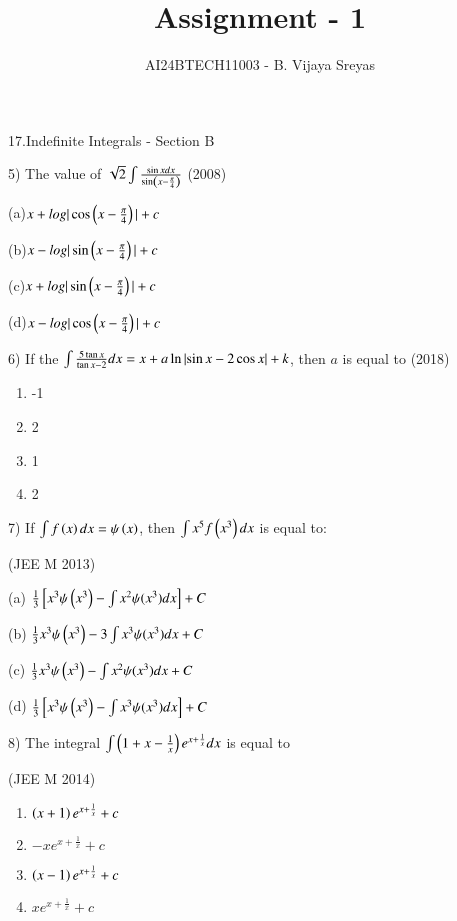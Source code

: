 \documentclass[journal,12pt,twocolumn]{IEEEtran}
\theoremstyle{remark}
\begin{document}

\vspace{3cm}

\title{Assignment - 1}
\author{AI24BTECH11003 - B. Vijaya Sreyas}
\maketitle
\newpage
\bigskip

\renewcommand{\thefigure}{\theenumi}
\renewcommand{\thetable}{\theenumi}

17.Indefinite Integrals - Section B

5)
	 The value of $\sqrt{2}\int\frac{\sin xdx}{\sin \left(x-\frac{\pi}{4}\right)}$
		\hfill{(2008)}

		(a)$x+log|\cos \left(x-\frac{\pi}{4}\right)|+c$

		(b)$x-log|\sin \left(x-\frac{\pi}{4}\right)|+c$

		(c)$x+log|\sin \left(x-\frac{\pi}{4}\right)|+c$

		(d)$x-log|\cos \left(x-\frac{\pi}{4}\right)|+c$

6)
	 If the $\int\frac{5\tan x}{\tan x-2}dx=x+a\ln \left\vert\sin x-2\cos x\right\vert+k$, then $a$ is equal to
		\hfill{(2018)}

		\begin{multicols}{4}
			\begin{enumerate}[label=(\alph*)]
				\item -1
				\item 2
				\item 1
				\item 2
			\end{enumerate}
		\end{multicols}
		
7)
	If $\int f\left(x\right)dx=\psi\left(x\right)$, then $\int x^5f\left(x^3\right)dx$ is equal to:

		\hfill{(JEE M 2013)}

		(a) $\frac{1}{3}{}\left[x^3\psi\left(x^3\right)-\int x^2\psi(x^3)dx\right] + C$

		(b) $\frac{1}{3}x^3\psi\left(x^3\right)-3\int x^3\psi(x^3)dx + C$

		(c) $\frac{1}{3}x^3\psi\left(x^3\right)-\int x^2\psi(x^3)dx + C$

		(d) $\frac{1}{3}{}\left[x^3\psi\left(x^3\right)-\int x^3\psi(x^3)dx\right] + C$

8)
	 The integral $\int\left(1+x-\frac{1}{x}\right)e^{x+\frac{1}{x}}dx$ is equal to

		\hfill{(JEE M 2014)}

		\begin{multicols}{2}
			\begin{enumerate}[label=(\alph*)]
				\item $\left(x+1\right)e^{x+\frac{1}{x}}+c$
				\item $-xe^{x+\frac{1}{x}}+c$
				\item $\left(x-1\right)e^{x+\frac{1}{x}}+c$
				\item $xe^{x+\frac{1}{x}}+c$
			\end{enumerate}
		\end{multicols}
\end{document}
